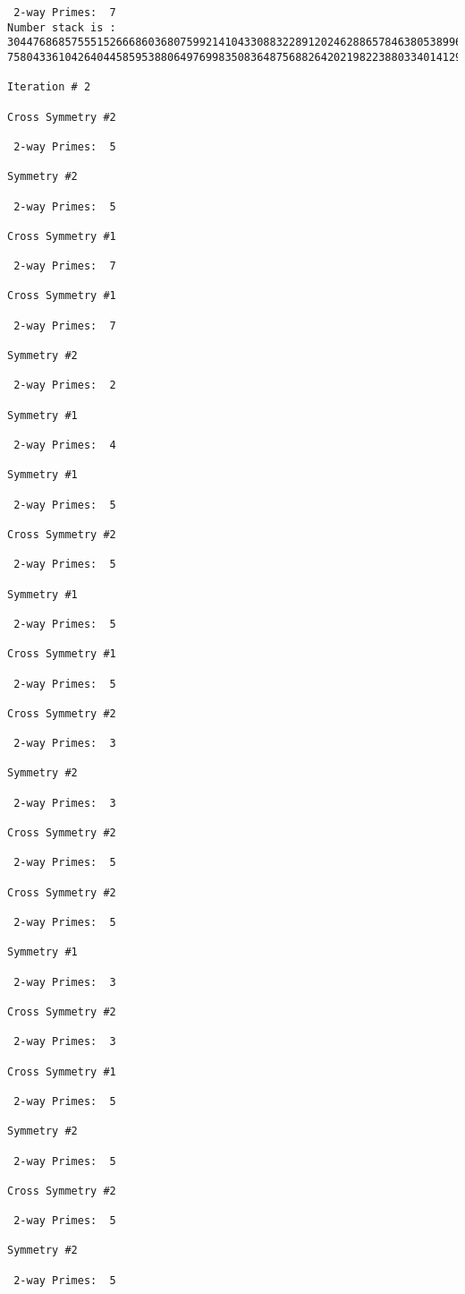 {{{{\begin{verbatim}
 2-way Primes: 	7
Number stack is :
30447686857555152666860368075992141043308832289120246288657846380538996794608835958544046240163340857
75804336104264044585953880649769983508364875688264202198223880334014129957086306866625155575868674403

Iteration #	2

Cross Symmetry #2

 2-way Primes: 	5

Symmetry #2

 2-way Primes: 	5

Cross Symmetry #1

 2-way Primes: 	7

Cross Symmetry #1

 2-way Primes: 	7

Symmetry #2

 2-way Primes: 	2

Symmetry #1

 2-way Primes: 	4

Symmetry #1

 2-way Primes: 	5

Cross Symmetry #2

 2-way Primes: 	5

Symmetry #1

 2-way Primes: 	5

Cross Symmetry #1

 2-way Primes: 	5

Cross Symmetry #2

 2-way Primes: 	3

Symmetry #2

 2-way Primes: 	3

Cross Symmetry #2

 2-way Primes: 	5

Cross Symmetry #2

 2-way Primes: 	5

Symmetry #1

 2-way Primes: 	3

Cross Symmetry #2

 2-way Primes: 	3

Cross Symmetry #1

 2-way Primes: 	5

Symmetry #2

 2-way Primes: 	5

Cross Symmetry #2

 2-way Primes: 	5

Symmetry #2

 2-way Primes: 	5


\end{verbatim}}}}}
